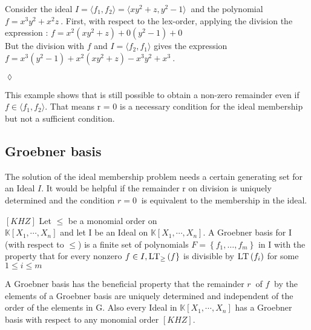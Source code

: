 \begin{env_example}\normalfont
Consider the ideal $I = \langle f_{1},f_{2} \rangle = \langle xy^{2}+z,y^{2}-1 \rangle~$
and the polynomial $f = x^{3}y^{2}+x^{2}z~$.
First, with respect to the lex-order, applying the division the expression : $f = x^{2}(xy^{2}+z) + 0(y^{2}-1) + 0$ \\
But the division with $f$ and $I = \langle f_{2},f_{1} \rangle$ gives the expression \\ $f = x^{3}(y^{2}-1) + x^{2}(xy^{2}+z) -x^{3}y^{2}+x^{3}~$.
\begin{flushright}
$\lozenge$
\end{flushright}
\end{env_example}



This example shows that is still possible to obtain a non-zero remainder even if $f \in \langle f_{1},f_{2} \rangle $. That means r = 0 is a  necessary condition for the ideal membership but not a sufficient condition.
\subsection{Groebner basis}
\label{subsec:Groebner}

The solution of the ideal membership problem needs a certain generating set for an Ideal $I$. It would be helpful if the remainder r on division is uniquely determined and the condition $ r = 0~$ is equivalent to the membership in the ideal.



\begin{env_definition}
$[KHZ]$
Let $\leq$ be a monomial order on \\ $\mathbb{K}\left[X_{1}, \cdots, X_{n}\right]$ and let I be an Ideal on $ \mathbb{K}\left[X_{1}, \cdots, X_{n}\right]  $. A Groebner basis for I (with respect to $\leq$) is a finite set of polynomials $ F = \left\lbrace f_{1}, \ldots , f_{m} \right\rbrace $ in I with the property that for every nonzero $ f \in I , \textsc{LT}_{\geq}\left( f\right\rbrace $ is divisible by $\textsc{LT}\left( f_{i}\right) $ for some $ 1 \leq i \leq m $

\end{env_definition}

A Groebner basis has the beneficial property that the remainder $r~$ of $f~$ by the elements of a Groebner basis are uniquely determined and independent of the order of the elements in G.
Also every Ideal in $\mathbb{K}\left[X_{1}, \cdots, X_{n}\right]$ has a Groebner basis with respect to any monomial order $\left[ KHZ\right] $.\\ 


